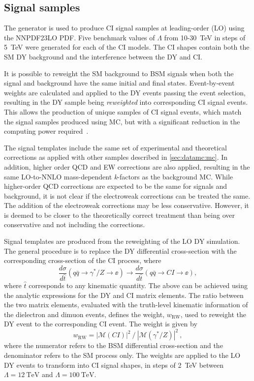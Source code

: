 \subsection{Signal samples}\label{sec:datamc:mc:sig}
The  generator is used to produce CI signal samples at leading-order (LO) using the NNPDF23LO PDF. Five benchmark values of $\Lambda$ from 10-\SI{30}{\tera\electronvolt} in steps of \SI{5}{\tera\electronvolt} were generated for each of the CI models. The CI shapes contain both the SM DY background and the interference between the DY and CI. 

It is possible to reweight the SM background to BSM signals when both the signal and background have the same initial and final states. Event-by-event weights are calculated and applied to the DY events passing the event selection, resulting in the DY sample being \emph{reweighted} into corresponding CI signal events. This allows the production of unique samples of CI signal events, which match the signal samples produced using MC, but with a significant reduction in the computing power required~\cite{EXOT-2016-05}. 

The signal templates include the same set of experimental and theoretical corrections as applied with other samples described in \cref{sec:datamc:mc}. In addition, higher order QCD and EW corrections are also applied, resulting in the same LO-to-NNLO mass-dependent \emph{k}-factors as the background MC. While higher-order QCD corrections are expected to be the same for signals and background, it is not clear if the electroweak corrections can be treated the same. The addition of the electroweak corrections may be less conservative. However, it is deemed to be closer to the theoretically correct treatment than being over conservative and not including the corrections. 

Signal templates are produced from the reweighting of the  LO DY simulation. The general procedure is to replace the DY differential cross-section with the corresponding cross-section of the CI process, where
\begin{equation}
   \frac{d\sigma}{d\hat{t}}(q\bar{q} \rightarrow \gamma^*/Z \rightarrow \ee) \rightarrow \frac{d\sigma}{d\hat{t}}(q\bar{q} \rightarrow CI \rightarrow \ee),
\end{equation}
where $\hat{t}$ corresponds to any kinematic quantity. The above can be achieved using the analytic expressions for the DY and CI matrix elements. The ratio between the two matrix elements, evaluated with the truth-level kinematic information of the dielectron and dimuon events, defines the weight, $w_{\mathrm{RW}}$, used to reweight the DY event to the corresponding CI event. The weight is given by~\cite{EXOT-2016-05}
\begin{equation}
    w_{\mathrm{RW}} = |\mathcal{M}(CI)|^2~/~|\mathcal{M}(\gamma^*/Z)|^2~,
\end{equation}
where the numerator refers to the BSM differential cross-section and the denominator refers to the SM process only. The weights are applied to the LO DY events to transform into CI signal shapes, in steps of \SI{2}{\tera\electronvolt} between $\Lambda = \SI{12}{\tera\electronvolt}$ and $\Lambda = \SI{100}{\tera\electronvolt}$. 

